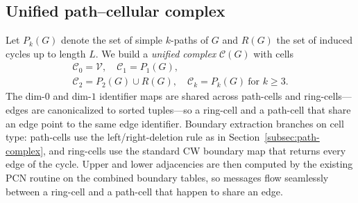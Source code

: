 \documentclass{article}
\begin{document}
\subsection{Unified path--cellular complex}
\label{subsec:unified}
Let $P_k(G)$ denote the set of simple $k$-paths of $G$ and $R(G)$ the set of induced cycles up to length $L$. We build a \emph{unified complex} $\mathcal{C}(G)$ with cells
\begin{gather*}
  \mathcal{C}_0 = \mathcal{V}, \quad \mathcal{C}_1 = P_1(G), \\
  \mathcal{C}_2 = P_2(G) \cup R(G), \quad \mathcal{C}_k = P_k(G) \ \text{for } k \geq 3.
\end{gather*}
The dim-$0$ and dim-$1$ identifier maps are shared across path-cells and ring-cells---edges are canonicalized to sorted tuples---so a ring-cell and a path-cell that share an edge point to the same edge identifier. Boundary extraction branches on cell type: path-cells use the left/right-deletion rule as in Section~\ref{subsec:path-complex}, and ring-cells use the standard CW boundary map that returns every edge of the cycle. Upper and lower adjacencies are then computed by the existing PCN routine on the combined boundary tables, so messages flow seamlessly between a ring-cell and a path-cell that happen to share an edge.
\end{document}
